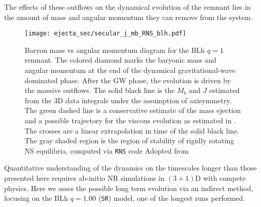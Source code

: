 %
The effects of these outflows on the dynamical evolution of the remnant 
lies in the amount of mass and angular momentum they can remove from the system.
%

\begin{figure}[t]
    \centering 
    \texttt{[image: ejecta\_sec/secular\_j\_mb\_RNS\_blh.pdf]}
    \caption{Baryon mass vs angular momentum diagram for the BLh $q=1$ remnant.
        The colored diamond marks the baryonic mass and angular momentum at the end
        of the dynamical gravitational-wave dominated phase.
        After the GW phase, the evolution is driven by the massive outflows.
        The solid black line is the $M_b$ and $J$ estimated from the 3D data
        integrals under the assumption of axisymmetry.
        The green dashed line is a conservative estimate
        of the mass ejection and a possible trajectory for the viscous
        evolution as estimated in \citet{Radice:2018xqa}. The crosses are
        a linear extrapolation in time of the solid black line. The gray
        shaded region is the region of stability of rigidly rotating NS equilibria,
        computed via \texttt{RNS} code
        Adopted from \cite{Nedora:2020pak}
    }
    \label{fig:total_j_mb_rns_blh}
\end{figure}
Quantitative understanding of the \pmerg{} dynamics on the timescales 
longer than those presented here requires ab-initio \ac{NR} simulations in 
$(3+1)$D with compete physics.
%
Here we asses the possible long term evolution via an indirect method, 
focusing on the BLh $q=1.00$ (\texttt{SR}) model, one of the longest runs 
performed. 


